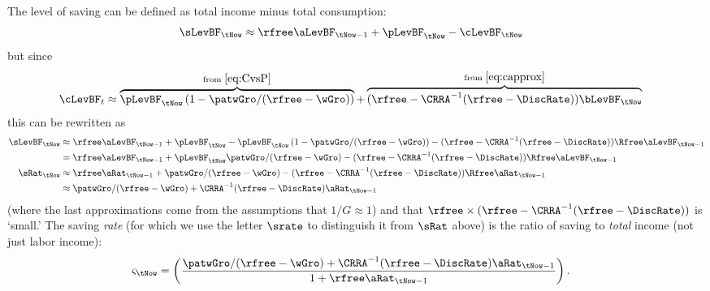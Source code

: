 The level of saving can be defined as total income minus total consumption:
\begin{equation}\begin{gathered}\begin{aligned}
  \sLevBF_{\tNow} & \approx  \rfree \aLevBF_{\tNow-1} + \pLevBF_{\tNow} - \cLevBF_{\tNow}
\end{aligned}\end{gathered}\end{equation}
but since
\begin{equation}\begin{gathered}\begin{aligned}
  \label{eq:cFromHandB}
  \cLevBF_{t} & \approx  \overbrace{\pLevBF_{\tNow} \left(1 - \patwGro/(\rfree - \wGro)\right)}^{\text{from }\eqref{eq:CvsP}}+\overbrace{(\rfree-\CRRA^{-1}(\rfree-\DiscRate))\bLevBF_{\tNow}}^{\text{from }\eqref{eq:capprox}}
\end{aligned}\end{gathered}\end{equation}
this can be rewritten as
\begin{equation}\begin{gathered}\begin{aligned}
 \sLevBF_{\tNow} & \approx  \rfree \aLevBF_{\tNow-1} + \pLevBF_{\tNow}- \pLevBF_{\tNow} \left(1 - \patwGro/(\rfree - \wGro)\right) - (\rfree-\CRRA^{-1}(\rfree-\DiscRate))\Rfree \aLevBF_{\tNow-1}
\\ & =  \rfree \aLevBF_{\tNow-1} + \pLevBF_{\tNow} \patwGro/(\rfree - \wGro)- (\rfree-\CRRA^{-1}(\rfree-\DiscRate))\Rfree\aLevBF_{\tNow-1}
\\ \sRat_{\tNow} & \approx  \rfree \aRat_{\tNow-1} + \patwGro/(\rfree - \wGro)- (\rfree-\CRRA^{-1}(\rfree-\DiscRate))\Rfree \aRat_{\tNow-1}
\\ & \approx  \patwGro/(\rfree - \wGro)+ \CRRA^{-1}(\rfree-\DiscRate)\aRat_{\tNow-1}
\end{aligned}\end{gathered}\end{equation}
(where the last approximations come from the assumptions that $1/G \approx 1$) and that $\rfree \times (\rfree-\CRRA^{-1}(\rfree-\DiscRate))$ is `small.'  The saving {\it rate} (for which we use the letter $\srate$ to distinguish it from $\sRat$ above) is the ratio of saving to {\it total} income (not just labor income):
\begin{equation}\begin{gathered}\begin{aligned}
\varsigma_{\tNow} & =  \left(\frac{\patwGro/(\rfree - \wGro)+ \CRRA^{-1}(\rfree-\DiscRate)\aRat_{\tNow-1}}{1+ \rfree \aRat_{\tNow-1}}\right).
\end{aligned}\end{gathered}\end{equation}

